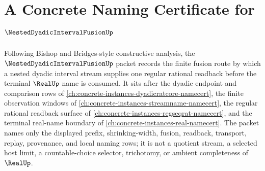 \chapter{A Concrete Naming Certificate for $\NestedDyadicIntervalFusionUp$}
\label{ch:concrete-instances-nested-dyadic-interval-fusion-namecert}

Following Bishop and Bridges-style constructive analysis, the $\NestedDyadicIntervalFusionUp$ packet records the finite fusion route by which a nested dyadic interval stream supplies one regular rational readback before the terminal $\RealUp$ name is consumed. It sits after the dyadic endpoint and comparison rows of \autoref{ch:concrete-instances-dyadicratcore-namecert}, the finite observation windows of \autoref{ch:concrete-instances-streamname-namecert}, the regular rational readback surface of \autoref{ch:concrete-instances-regseqrat-namecert}, and the terminal real-name boundary of \autoref{ch:concrete-instances-real-namecert}. The packet names only the displayed prefix, shrinking-width, fusion, readback, transport, replay, provenance, and local naming rows; it is not a quotient stream, a selected host limit, a countable-choice selector, trichotomy, or ambient completeness of $\RealUp$.

